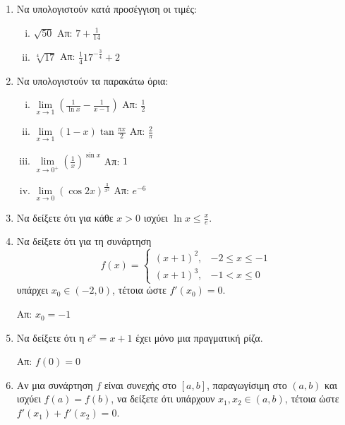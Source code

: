 


\everymath{\displaystyle}



\begin{center}
\end{center}


\vspace{\baselineskip}

\begin{enumerate}
  \item Να υπολογιστούν κατά προσέγγιση οι τιμές:
  \begin{enumerate}[i)]
    \item $\sqrt{50}$ \hfill Απ: $7+\frac{1}{14}$
    \item $\sqrt[4]{17}$ \hfill Απ: $\frac{1}{4}17^{-\frac{3}{4}}+2$
  \end{enumerate}

  \item Να υπολογιστούν τα παρακάτω όρια:
  \begin{enumerate}[i)]
    \item $\lim\limits_{x\to 1}\left(\frac{1}{\ln x}-\frac{1}{x-1}\right)$ \hfill Απ: $\frac{1}{2}$
    \item $\lim\limits_{x\to 1}(1-x)\tan \frac{\pi x}{2}$ \hfill Απ: $\frac{2}{\pi}$
    \item $\lim\limits_{x\to 0^{+}}\left(\frac{1}{x}\right)^{\sin x}$ \hfill Απ: $1$
    \item $\lim\limits_{x\to 0}(\cos 2x)^{\frac{3}{x^{2}}}$ \hfill Απ: $e^{-6}$
  \end{enumerate}

  \item Να δείξετε ότι για κάθε $x>0$ ισχύει $\ln x\leq \frac{x}{e}$. 

  \item Να δείξετε ότι για τη συνάρτηση 
	  \[
		  f(x) = \begin{cases}
			  (x+1)^{2}, & -2\leq x\leq -1 \\
			  (x+1)^{3}, & -1<x\leq 0
		  \end{cases}  
	  \]
	  υπάρχει $ x_{0} \in (-2,0) $, τέτοια ώστε $ f'(x_{0}) = 0 $.

	  \hfill Απ: $ x_{0} = -1 $

  \item Να δείξετε ότι η $ e^{x} = x+1 $ έχει μόνο μια πραγματική ρίζα.
	  
	  \hfill Απ: $ f(0) = 0 $

  \item Αν μια συνάρτηση $f$ είναι συνεχής στο $ [a,b] $, παραγωγίσιμη στο $
	  (a,b) $ και ισχύει $ f(a) = f(b) $, να δείξετε ότι υπάρχουν $ x_{1}, x_{2}
	  \in (a,b)$, τέτοια ώστε $ f'(x_{1}) + f'(x_{2}) = 0 $.

\end{enumerate}


